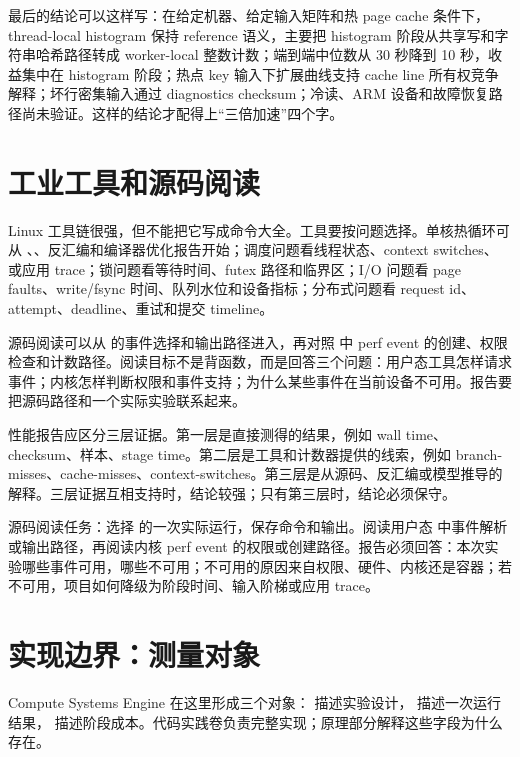 最后的结论可以这样写：在给定机器、给定输入矩阵和热 page cache 条件下，thread-local histogram 保持 reference 语义，主要把 histogram 阶段从共享写和字符串哈希路径转成 worker-local 整数计数；端到端中位数从 30 秒降到 10 秒，收益集中在 histogram 阶段；热点 key 输入下扩展曲线支持 cache line 所有权竞争解释；坏行密集输入通过 diagnostics checksum；冷读、ARM 设备和故障恢复路径尚未验证。这样的结论才配得上“三倍加速”四个字。

\section{工业工具和源码阅读}

Linux 工具链很强，但不能把它写成命令大全。工具要按问题选择。单核热循环可从 、、反汇编和编译器优化报告开始；调度问题看线程状态、context switches、 或应用 trace；锁问题看等待时间、futex 路径和临界区；I/O 问题看 page faults、write/fsync 时间、队列水位和设备指标；分布式问题看 request id、attempt、deadline、重试和提交 timeline。

源码阅读可以从  的事件选择和输出路径进入，再对照  中 perf event 的创建、权限检查和计数路径。阅读目标不是背函数，而是回答三个问题：用户态工具怎样请求事件；内核怎样判断权限和事件支持；为什么某些事件在当前设备不可用。报告要把源码路径和一个实际实验联系起来。

性能报告应区分三层证据。第一层是直接测得的结果，例如 wall time、checksum、样本、stage time。第二层是工具和计数器提供的线索，例如 branch-misses、cache-misses、context-switches。第三层是从源码、反汇编或模型推导的解释。三层证据互相支持时，结论较强；只有第三层时，结论必须保守。

\begin{sourcereadingbox}
源码阅读任务：选择  的一次实际运行，保存命令和输出。阅读用户态  中事件解析或输出路径，再阅读内核 perf event 的权限或创建路径。报告必须回答：本次实验哪些事件可用，哪些不可用；不可用的原因来自权限、硬件、内核还是容器；若不可用，项目如何降级为阶段时间、输入阶梯或应用 trace。
\end{sourcereadingbox}

\section{实现边界：测量对象}

Compute Systems Engine 在这里形成三个对象： 描述实验设计， 描述一次运行结果， 描述阶段成本。代码实践卷负责完整实现；原理部分解释这些字段为什么存在。

